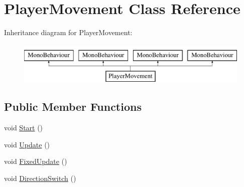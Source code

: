 \hypertarget{class_player_movement}{}\section{Player\+Movement Class Reference}
\label{class_player_movement}
Inheritance diagram for Player\+Movement\+:\begin{figure}[H]
\begin{center}
\leavevmode
\includegraphics[height=2.000000cm]{class_player_movement}
\end{center}
\end{figure}
\subsection*{Public Member Functions}
\begin{DoxyCompactItemize}
\item 
void \mbox{\hyperlink{class_player_movement_abf3660ca2b1a352b4a9da98437c61aa3}{Start}} ()
\item 
void \mbox{\hyperlink{class_player_movement_aaf9b77d7177d538be9c1447d08191322}{Update}} ()
\item 
void \mbox{\hyperlink{class_player_movement_a0caaa871b9ef680c9f02bd0e22c77db1}{Fixed\+Update}} ()
\item 
void \mbox{\hyperlink{class_player_movement_aea65f5f7247feb09772da2543c8ec427}{Direction\+Switch}} ()
\end{DoxyCompactItemize}
